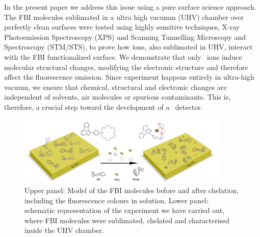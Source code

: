 \documentclass[aps,prl,reprint,longbibliography,superscriptaddress, english]{revtex4-1}
\begin{document}
In the present paper we address this issue using a pure surface science approach. The FBI molecules sublimated in a ultra high vacumm (UHV) chamber over perfectly clean surfaces were tested using highly sensitive techniques, X-ray Photoemission Spectroscopy (XPS) and Scanning Tunnelling Microscopy and Spectroscopy (STM/STS), to  prove how ions, also sublimated in UHV, interact with the FBI functionalized surface.  We demonstrate that only \Bapp\ ions induce molecular structural changes, modifying the electronic structure and therefore affect the fluorescence emission. Since experiment happens entirely in ultra-high vacuum, we ensure that chemical, structural and electronic changes are independent of solvents, air molecules or spurious contaminants. This is, therefore, a crucial step toward the development of a \Bapp\ detector.

 \begin{figure}[ht!]
	\includegraphics[width=0.9\textwidth]{figures/figura_1a.jpg}
	\caption{\label{ModeloFBI} 
    Upper panel: Model of the FBI molecules before and after chelation, including the fluorescence colours in solution. Lower panel: schematic representation of the experiment we have carried out, where FBI molecules were sublimated, chelated and characterised inside the UHV chamber.}
\end{figure}  
\end{document}
